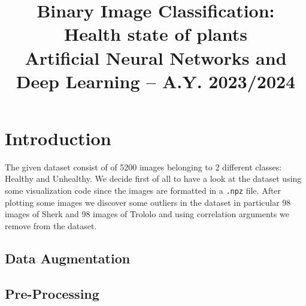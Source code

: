 \documentclass[conference,compsoc,11pt]{IEEEtran}
\begin{document}
\title{Binary Image Classification:\\ Health state of plants
\\ \large Artificial Neural Networks and Deep Learning -- A.Y. 2023/2024}

\author{
}
\maketitle


\IEEEpeerreviewmaketitle

\section{Introduction}
The given dataset consist of of 5200 images belonging to 2 different classes: Healthy and Unhealthy. We decide first of all to have a look at the dataset using some visualization code since the images are formatted in a \verb|.npz| file. After plotting some images we discover some outliers in the dataset in particular 98 images of Sherk and 98 images of Trololo and using correlation arguments we remove from the dataset.

\subsection{Data Augmentation}


\subsection{Pre-Processing}
\end{document}
